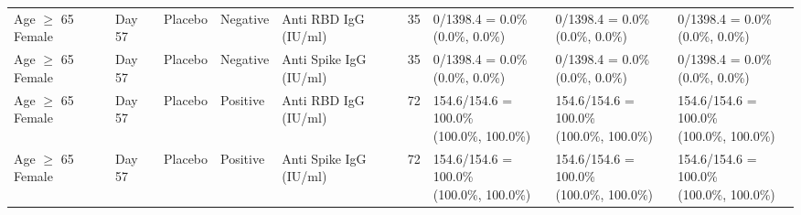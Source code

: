 \documentclass[]{book}
\theoremstyle{definition}
\theoremstyle{definition}
\theoremstyle{definition}
\newcommand{\1}{\mathbbm{1}}
\begin{document}
\begin{landscape}
\begin{ThreePartTable}
\begin{longtable}[t]{>{\raggedright\arraybackslash}p{2.7cm}llllllll}
\hspace{1em}Age $\geq$ 65 Female & Day 57 & Placebo & Negative & Anti RBD IgG (IU/ml) & 35 & \makecell[l]{0/1398.4 = 0.0\%\\(0.0\%, 0.0\%)} & \makecell[l]{0/1398.4 = 0.0\%\\(0.0\%, 0.0\%)} & \makecell[l]{0/1398.4 = 0.0\%\\(0.0\%, 0.0\%)}\\
\hspace{1em}Age $\geq$ 65 Female & Day 57 & Placebo & Negative & Anti Spike IgG (IU/ml) & 35 & \makecell[l]{0/1398.4 = 0.0\%\\(0.0\%, 0.0\%)} & \makecell[l]{0/1398.4 = 0.0\%\\(0.0\%, 0.0\%)} & \makecell[l]{0/1398.4 = 0.0\%\\(0.0\%, 0.0\%)}\\
\hspace{1em}Age $\geq$ 65 Female & Day 57 & Placebo & Positive & Anti RBD IgG (IU/ml) & 72 & \makecell[l]{154.6/154.6 = 100.0\%\\(100.0\%, 100.0\%)} & \makecell[l]{154.6/154.6 = 100.0\%\\(100.0\%, 100.0\%)} & \makecell[l]{154.6/154.6 = 100.0\%\\(100.0\%, 100.0\%)}\\
\hspace{1em}Age $\geq$ 65 Female & Day 57 & Placebo & Positive & Anti Spike IgG (IU/ml) & 72 & \makecell[l]{154.6/154.6 = 100.0\%\\(100.0\%, 100.0\%)} & \makecell[l]{154.6/154.6 = 100.0\%\\(100.0\%, 100.0\%)} & \makecell[l]{154.6/154.6 = 100.0\%\\(100.0\%, 100.0\%)}\\*
\end{longtable}
\end{ThreePartTable}


\clearpage


\end{landscape}
\end{document}
